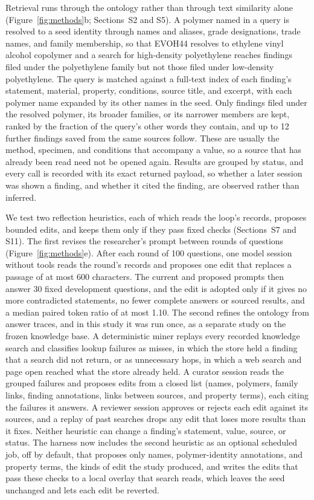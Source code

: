 \documentclass[journal=mamobx,manuscript=article]{achemso}
\begin{document}
Retrieval runs through the ontology rather than through text similarity alone (Figure~\ref{fig:methods}b; Sections~S2 and S5).
A polymer named in a query is resolved to a seed identity through names and aliases, grade designations, trade names, and family membership, so that EVOH44 resolves to ethylene vinyl alcohol copolymer and a search for high-density polyethylene reaches findings filed under the polyethylene family but not those filed under low-density polyethylene.
The query is matched against a full-text index of each finding's statement, material, property, conditions, source title, and excerpt, with each polymer name expanded by its other names in the seed.
Only findings filed under the resolved polymer, its broader families, or its narrower members are kept, ranked by the fraction of the query's other words they contain, and up to 12 further findings saved from the same sources follow.
These are usually the method, specimen, and conditions that accompany a value, so a source that has already been read need not be opened again.
Results are grouped by status, and every call is recorded with its exact returned payload, so whether a later session was shown a finding, and whether it cited the finding, are observed rather than inferred.

We test two reflection heuristics, each of which reads the loop's records, proposes bounded edits, and keeps them only if they pass fixed checks (Sections~S7 and S11).
The first revises the researcher's prompt between rounds of questions (Figure~\ref{fig:methods}e).
After each round of 100 questions, one model session without tools reads the round's records and proposes one edit that replaces a passage of at most 600 characters.
The current and proposed prompts then answer 30 fixed development questions, and the edit is adopted only if it gives no more contradicted statements, no fewer complete answers or sourced results, and a median paired token ratio of at most 1.10.
The second refines the ontology from answer traces, and in this study it was run once, as a separate study on the frozen knowledge base.
A deterministic miner replays every recorded knowledge search and classifies lookup failures as misses, in which the store held a finding that a search did not return, or as unnecessary hops, in which a web search and page open reached what the store already held.
A curator session reads the grouped failures and proposes edits from a closed list (names, polymers, family links, finding annotations, links between sources, and property terms), each citing the failures it answers.
A reviewer session approves or rejects each edit against its sources, and a replay of past searches drops any edit that loses more results than it fixes.
Neither heuristic can change a finding's statement, value, source, or status.
The harness now includes the second heuristic as an optional scheduled job, off by default, that proposes only names, polymer-identity annotations, and property terms, the kinds of edit the study produced, and writes the edits that pass these checks to a local overlay that search reads, which leaves the seed unchanged and lets each edit be reverted.
\end{document}
